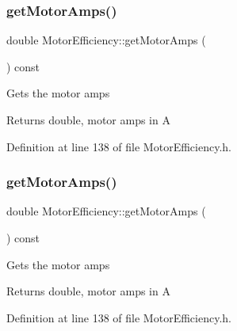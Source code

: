 \mbox{\label{class_motor_efficiency_a955906509a4b49274b35c1b119c4a4b4}} 
\subsubsection{\texorpdfstring{get\+Motor\+Amps()}{getMotorAmps()}\hspace{0.1cm}{\footnotesize\ttfamily [1/3]}}
{\footnotesize\ttfamily double Motor\+Efficiency\+::get\+Motor\+Amps (\begin{DoxyParamCaption}{ }\end{DoxyParamCaption}) const\hspace{0.3cm}{\ttfamily [inline]}}

Gets the motor amps \begin{DoxyReturn}{Returns}
double, motor amps in A 
\end{DoxyReturn}


Definition at line 138 of file Motor\+Efficiency.\+h.

\mbox{\label{class_motor_efficiency_a955906509a4b49274b35c1b119c4a4b4}} 
\subsubsection{\texorpdfstring{get\+Motor\+Amps()}{getMotorAmps()}\hspace{0.1cm}{\footnotesize\ttfamily [2/3]}}
{\footnotesize\ttfamily double Motor\+Efficiency\+::get\+Motor\+Amps (\begin{DoxyParamCaption}{ }\end{DoxyParamCaption}) const\hspace{0.3cm}{\ttfamily [inline]}}

Gets the motor amps \begin{DoxyReturn}{Returns}
double, motor amps in A 
\end{DoxyReturn}


Definition at line 138 of file Motor\+Efficiency.\+h.

\mbox{\label{class_motor_efficiency_a955906509a4b49274b35c1b119c4a4b4}} 
